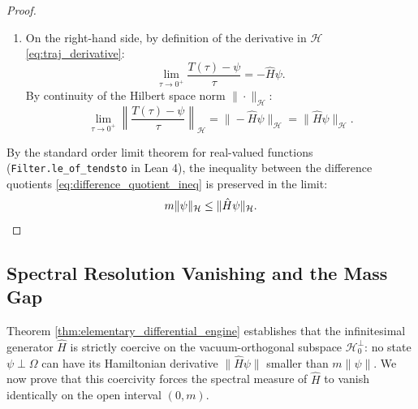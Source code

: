 \begin{proof}
\begin{enumerate}
    \item On the right-hand side, by definition of the derivative in $\mathcal{H}$ \eqref{eq:traj_derivative}:
    \begin{equation}
    \lim_{\tau \to 0^+} \frac{T(\tau) - \psi}{\tau} = -\hat{H}\psi.
    \end{equation}
    By continuity of the Hilbert space norm $\|\cdot\|_{\mathcal{H}}$:
    \begin{equation}
    \lim_{\tau \to 0^+} \left\| \frac{T(\tau) - \psi}{\tau} \right\|_{\mathcal{H}} = \|-\hat{H}\psi\|_{\mathcal{H}} = \|\hat{H}\psi\|_{\mathcal{H}}.
    \end{equation}
\end{enumerate}
By the standard order limit theorem for real-valued functions (\texttt{Filter.le\_of\_tendsto} in Lean 4), the inequality between the difference quotients \eqref{eq:difference_quotient_ineq} is preserved in the limit:
\begin{equation}
m \|\psi\|_{\mathcal{H}} \le \|\hat{H}\psi\|_{\mathcal{H}}. \qedhere
\end{equation}
\end{proof}

\subsection{Spectral Resolution Vanishing and the Mass Gap}
\label{subsec:spectral_projection_vanishing}

Theorem \ref{thm:elementary_differential_engine} establishes that the infinitesimal generator $\hat{H}$ is strictly coercive on the vacuum-orthogonal subspace $\mathcal{H}_0^\perp$: no state $\psi \perp \Omega$ can have its Hamiltonian derivative $\|\hat{H}\psi\|$ smaller than $m \|\psi\|$. We now prove that this coercivity forces the spectral measure of $\hat{H}$ to vanish identically on the open interval $(0, m)$.

